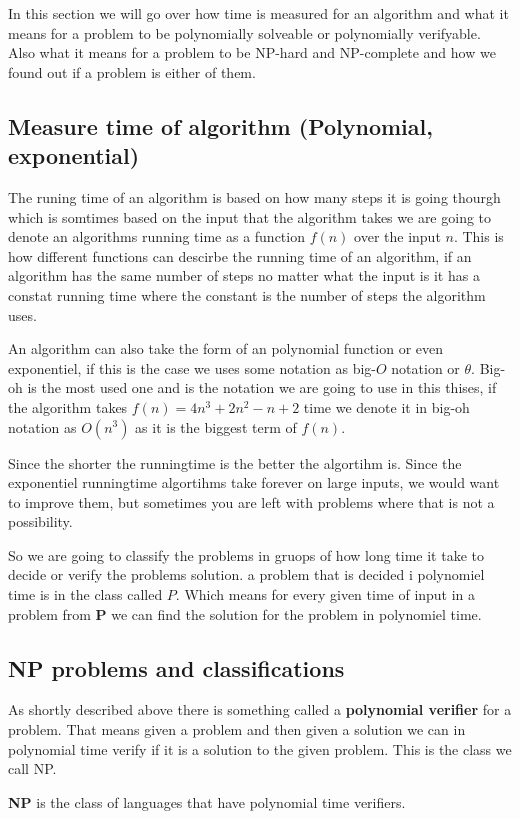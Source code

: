 In this section we will go over how time is measured for an algorithm and what it means for a problem to be polynomially solveable or polynomially verifyable. 
Also what it means for a problem to be NP-hard and NP-complete and how we found out if a problem is either of them. 

\subsection{Measure time of algorithm (Polynomial, exponential)}
The runing time of an algorithm is based on how many steps it is going thourgh which is somtimes based on the input that the algorithm takes we are going to denote an algorithms running time as a function $f(n)$ over the input $n$. 
This is how different functions can descirbe the running time of an algorithm, if an algorithm has the same number of steps no matter what the input is it has a constat running time where the constant is the number of steps the algorithm uses. 

An algorithm can also take the form of an polynomial function or even exponentiel, if this is the case we uses some notation as big-$O$ notation or $\theta$. 
Big-oh is the most used one and is the notation we are going to use in this thises, if the algorithm takes $f(n)=4n^3 +2n^2-n+2$ time we denote it in big-oh notation as $O(n^3)$ as it is the biggest term of $f(n)$.  

Since the shorter the runningtime is the better the algortihm is.
Since the exponentiel runningtime algortihms take forever on large inputs, we would want to improve them, but sometimes you are left with problems where that is not a possibility.

So we are going to classify the problems in gruops of how long time it take to decide or verify the problems solution. a problem that is decided i polynomiel time is in the class called $P$.
Which means for every given time of input in a problem from \textbf{P} we can find the solution for the problem in polynomiel time.

\subsection{NP problems and classifications}
As shortly described above there is something called a \textbf{polynomial verifier} for a problem. 
That means given a problem and then given a solution we can in polynomial time verify if it is a solution to the given problem. This is the class we call NP.
\begin{definition}
    \textbf{NP} is the class of languages that have polynomial time verifiers.
\end{definition}

